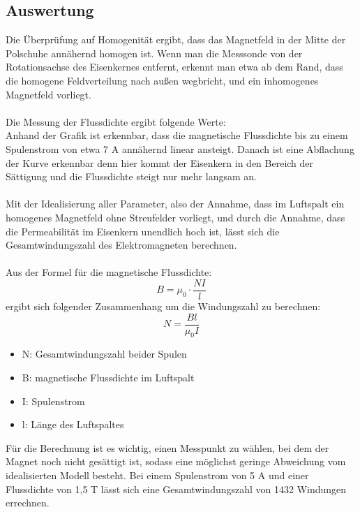 \documentclass[a4paper,twoside,12pt,DIV=13,BCOR=5mm,numbers=noenddot,cleardoublepage=empty]{scrbook}
\begin{document}
        \subsection{Auswertung}
        Die \"Uberpr\"ufung auf Homogenit\"at ergibt, dass das Magnetfeld in der Mitte der Polschuhe ann\"ahernd homogen ist. Wenn man die Messsonde von der Rotationsachse des Eisenkernes entfernt, erkennt man etwa ab dem Rand, dass die homogene Feldverteilung nach au\ss{}en wegbricht, und ein inhomogenes Magnetfeld vorliegt.
        \\
        \\
        Die Messung der Flussdichte ergibt folgende Werte:
        \pagebreak
        \\
        Anhand der Grafik ist erkennbar, dass die magnetische Flussdichte bis zu einem Spulenstrom von etwa 7 A ann\"ahernd linear ansteigt. Danach ist eine Abflachung der Kurve erkennbar denn hier kommt der Eisenkern in den Bereich der S\"attigung und die Flussdichte steigt nur mehr langsam an.
        \\
        \\
        Mit der Idealisierung aller Parameter, also der Annahme, dass im Luftspalt ein homogenes Magnetfeld ohne Streufelder vorliegt, und durch die Annahme, dass die Permeabilit\"at im Eisenkern unendlich hoch ist, l\"asst sich die Gesamtwindungszahl des Elektromagneten berechnen.
        \\
        \\
        Aus der Formel f\"ur die magnetische Flussdichte: 
        \begin{equation}
            B = \mu_\mathrm{0} \cdot \frac{NI}{l}
        \end{equation}
        ergibt sich folgender Zusammenhang um die Windungszahl zu berechnen:
        \begin{equation}
            N = \frac{Bl}{\mu_\mathrm{0}I}
        \end{equation}
        \begin{itemize}
            \item N: Gesamtwindungszahl beider Spulen
            \item B: magnetische Flussdichte im Luftspalt
            \item I: Spulenstrom
            \item l: L\"ange des Luftspaltes
        \end{itemize}
        F\"ur die Berechnung ist es wichtig, einen Messpunkt zu w\"ahlen, bei dem der Magnet noch nicht ges\"attigt ist, sodass eine m\"oglichst geringe Abweichung vom idealisierten Modell besteht. Bei einem Spulenstrom von 5 A und einer Flussdichte von 1,5 T l\"asst sich eine Gesamtwindungszahl von 1432 Windungen errechnen.  
\end{document}
